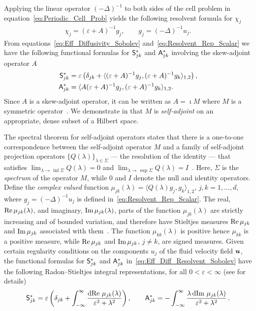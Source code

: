 \documentclass[amsa]{ipart}
\begin{document}
Applying the linear operator $(-\Delta)^{-1}$ to both sides of the cell
problem in equation~\eqref{eq:Periodic_Cell_Prob} yields the following
resolvent formula for $\chi_j$ 
%
\begin{align}\label{eq:Resolvent_Rep_Scalar}
  \chi_j=(\varepsilon+A)^{-1}g_j, \qquad 
  g_j=(-\Delta)^{-1}u_j.
\end{align}
%
From equations~\eqref{eq:Eff_Diffusivity_Sobolev}
and~\eqref{eq:Resolvent_Rep_Scalar} we have the following functional
formulas for $\mathsf{S}^*_{jk}$ and $\mathsf{A}^*_{jk}$ involving the
skew-adjoint operator $A$
%
\begin{align}\label{eq:Eff_Diff_Resolvent_Sobolev}
 \Sm^*_{jk}&=\varepsilon\left(\delta_{jk}
  +\langle(\varepsilon+A)^{-1}g_j,(\varepsilon+A)^{-1}g_k\rangle_{1,2}\right), 
  \\
 \Am^*_{jk}&=\langle A(\varepsilon+A)^{-1}g_j,(\varepsilon+A)^{-1}g_k\rangle_{1,2}.
 \notag
\end{align}
%
Since $A$ is a skew-adjoint operator, it can be written as $A=\imath M$
where $M$ is a symmetric operator~\cite{Stone:64}. We demonstrate in
 that $M$ is \emph{self-adjoint} on an
appropriate, dense subset of a Hilbert space.



The spectral theorem for self-adjoint operators states that there is a
one-to-one correspondence between the self-adjoint operator $M$ and a
family of self-adjoint projection operators $\{Q(\lambda)\}_{\lambda\in\Sigma}$ --- the
resolution of the identity --- that satisfies
$\lim_{\lambda\to\,\inf{\Sigma}}Q(\lambda)=0$ and
$\lim_{\lambda\to\,\sup{\Sigma}}Q(\lambda)=I$~\cite{Stone:64}. Here, $\Sigma$ is the
\emph{spectrum} of the operator $M$, while $0$ and $I$ denote the null
and identity operators. Define the \emph{complex valued} function
$\mu_{jk}(\lambda)=\langle Q(\lambda)g_j,g_k\rangle_{1,2}$, $j,k=1,\ldots,d$, where  $g_j=(-\Delta)^{-1}u_j$ is defined
in~\eqref{eq:Resolvent_Rep_Scalar}. 
The real, $\mbox{Re}\,\mu_{jk}(\lambda)$, and
imaginary, $\mbox{Im}\,\mu_{jk}(\lambda)$, parts of the function $\mu_{jk}(\lambda)$ are
strictly increasing and of bounded variation, and therefore have
Stieltjes measures $\mbox{Re}\,\mu_{jk}$ and $\mbox{Im}\,\mu_{jk}$ associated with
them~\cite{Stone:64}. The function $\mu_{kk}(\lambda)$ is positive hence
$\mu_{kk}$ is a positive measure, while $\mbox{Re}\,\mu_{jk}$ and $\mbox{Im}\,\mu_{jk}$,
$j\neq k$, are signed measures. Given certain regularity conditions on the
components $u_j$ of the fluid velocity field $\boldsymbol{u}$, the functional
formulas for $\mathsf{S}^*_{jk}$ and $\mathsf{A}^*_{jk}$
in~\eqref{eq:Eff_Diff_Resolvent_Sobolev} have the following
Radon--Stieltjes integral representations, for all $0<\varepsilon<\infty$ (see
 for details) 
%
\begin{align}\label{eq:Integral_Rep_kappa*}
  \Sm^*_{jk}=\varepsilon\left(\delta_{jk}+\int_{-\infty}^\infty\frac{\d\Real\,\mu_{jk}(\lambda)}{\varepsilon^2+\lambda^2}\right),
  \qquad
  \Am^*_{jk}=-\int_{-\infty}^\infty\frac{\lambda\,\d\Imag\,\mu_{jk}(\lambda)}{\varepsilon^2+\lambda^2}\,.         
\end{align}
%
\end{document}
